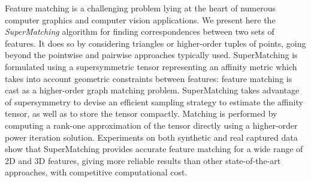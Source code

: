 Feature matching is a challenging problem lying at the heart of numerous computer graphics and computer vision applications.
We present here the \emph{SuperMatching} algorithm for finding correspondences between two sets of features.
It does so by considering triangles or higher-order tuples of points, going beyond the pointwise and pairwise approaches typically used.
SuperMatching is formulated using a supersymmetric tensor representing an affinity metric which takes into account geometric constraints between features:
feature matching is cast as a higher-order graph matching problem.
SuperMatching takes advantage of supersymmetry to devise an
efficient sampling strategy to estimate the affinity tensor, as well as to store the tensor compactly.
Matching is performed by computing a rank-one approximation of the tensor directly
using a higher-order power iteration solution.
Experiments on both synthetic and real captured data show that
SuperMatching provides accurate feature matching for a wide range of 2D and 3D features,
giving more reliable results than other state-of-the-art approaches, with competitive computational cost. 